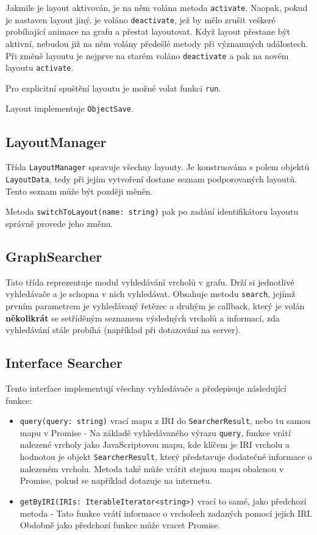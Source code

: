 Jakmile je layout aktivován, je na něm volána metoda \texttt{activate}. Naopak, pokud je nastaven layout jiný, je voláno \texttt{deactivate}, jež by mělo zrušit veškeré probíhající animace na grafu a přestat layoutovat. Když layout přestane být aktivní, nebudou již na něm volány předešlé metody při významných událostech. Při změně layoutu je nejprve na starém voláno \texttt{deactivate} a pak na novém layoutu \texttt{activate}.

Pro explicitní spuštění layoutu je možné volat funkci \texttt{run}.

Layout implementuje \texttt{ObjectSave}.

\subsection{LayoutManager}
Třída \texttt{LayoutManager} spravuje všechny layouty. Je konstruována s polem objektů \texttt{LayoutData}, tedy při jejím vytvoření dostane seznam podporovaných layoutů. Tento seznam může být později měněn.

Metoda \texttt{switchToLayout(name: string)} pak po zadání identifikátoru layoutu správně provede jeho změnu.

\newpage

\subsection{GraphSearcher}
Tato třída reprezentuje modul vyhledávání vrcholů v grafu. Drží si jednotlivé vyhledávače a je schopna v nich vyhledávat. Obsahuje metodu \texttt{search}, jejímž prvním parametrem je vyhledávaný řetězec a druhým je callback, který je volán \textbf{několikrát} se setříděným seznamem výsledných vrcholů a informací, zda vyhledávání stále probíhá (například při dotazování na server).

\subsection{Interface Searcher}
Tento interface implementují všechny vyhledávače a předepisuje následující funkce:
\begin{itemize}
  \item \texttt{query(query: string)} vrací mapu z IRI do \texttt{SearcherResult}, nebo tu samou mapu v Promise - Na základě vyhledávaného výrazu \texttt{query}, funkce vrátí nalezené vrcholy jako JavaScriptovou mapu, kde klíčem je IRI vrcholu a hodnotou je objekt \texttt{SearcherResult}, který představuje dodatečné informace o nalezeném vrcholu. Metoda také může vrátit stejnou mapu obalenou v Promise, pokud se například dotazuje na internetu.
  \item \texttt{getByIRI(IRIs: IterableIterator<string>)} vrací to samé, jako předchozí metoda - Tato funkce vrátí informace o vrcholech zadaných pomocí jejich IRI. Obdobně jako předchozí funkce může vracet Promise.
\end{itemize}

